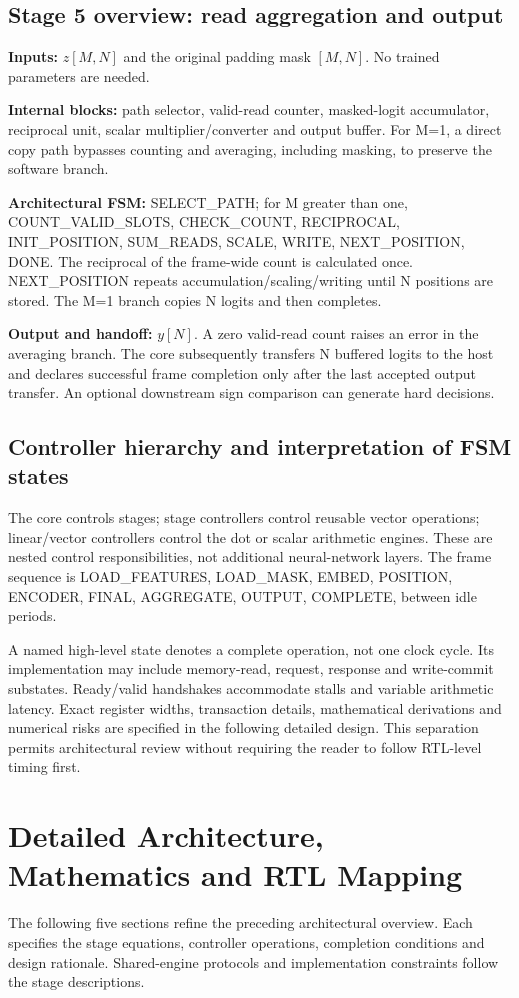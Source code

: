 \documentclass[11pt,a4paper]{article}
\begin{document}
\subsection{Stage 5 overview: read aggregation and output}
\textbf{Inputs:} $z[M,N]$ and the original padding mask $[M,N]$. No trained parameters are needed.

\textbf{Internal blocks:} path selector, valid-read counter, masked-logit accumulator, reciprocal unit, scalar multiplier/converter and output buffer. For M=1, a direct copy path bypasses counting and averaging, including masking, to preserve the software branch.

\textbf{Architectural FSM:} SELECT\_PATH; for M greater than one, COUNT\_VALID\_SLOTS, CHECK\_COUNT, RECIPROCAL, INIT\_POSITION, SUM\_READS, SCALE, WRITE, NEXT\_POSITION, DONE. The reciprocal of the frame-wide count is calculated once. NEXT\_POSITION repeats accumulation/scaling/writing until N positions are stored. The M=1 branch copies N logits and then completes.

\textbf{Output and handoff:} $y[N]$. A zero valid-read count raises an error in the averaging branch. The core subsequently transfers N buffered logits to the host and declares successful frame completion only after the last accepted output transfer. An optional downstream sign comparison can generate hard decisions.

\subsection{Controller hierarchy and interpretation of FSM states}
The core controls stages; stage controllers control reusable vector operations; linear/vector controllers control the dot or scalar arithmetic engines. These are nested control responsibilities, not additional neural-network layers. The frame sequence is LOAD\_FEATURES, LOAD\_MASK, EMBED, POSITION, ENCODER, FINAL, AGGREGATE, OUTPUT, COMPLETE, between idle periods.

A named high-level state denotes a complete operation, not one clock cycle. Its implementation may include memory-read, request, response and write-commit substates. Ready/valid handshakes accommodate stalls and variable arithmetic latency. Exact register widths, transaction details, mathematical derivations and numerical risks are specified in the following detailed design. This separation permits architectural review without requiring the reader to follow RTL-level timing first.


\section{Detailed Architecture, Mathematics and RTL Mapping}
The following five sections refine the preceding architectural overview. Each specifies the stage equations, controller operations, completion conditions and design rationale. Shared-engine protocols and implementation constraints follow the stage descriptions.
\end{document}
